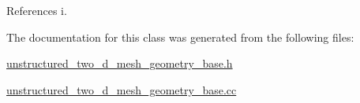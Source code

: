 References i.



The documentation for this class was generated from the following files\+:\begin{DoxyCompactItemize}
\item 
\hyperlink{unstructured__two__d__mesh__geometry__base_8h}{unstructured\+\_\+two\+\_\+d\+\_\+mesh\+\_\+geometry\+\_\+base.\+h}\item 
\hyperlink{unstructured__two__d__mesh__geometry__base_8cc}{unstructured\+\_\+two\+\_\+d\+\_\+mesh\+\_\+geometry\+\_\+base.\+cc}\end{DoxyCompactItemize}
